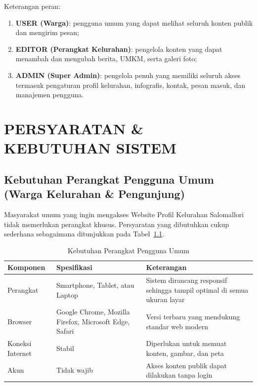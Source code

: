 \documentclass[12pt,a4paper]{report}
\begin{document}
Keterangan peran:
\begin{enumerate}[leftmargin=2em, itemsep=2pt]
    \item \textbf{USER (Warga)}: pengguna umum yang dapat melihat seluruh konten publik dan mengirim pesan;
    \item \textbf{EDITOR (Perangkat Kelurahan)}: pengelola konten yang dapat menambah dan mengubah berita, UMKM, serta galeri foto;
    \item \textbf{ADMIN (Super Admin)}: pengelola penuh yang memiliki seluruh akses termasuk pengaturan profil kelurahan, infografis, kontak, pesan masuk, dan manajemen pengguna.
\end{enumerate}

\chapter{PERSYARATAN \& KEBUTUHAN SISTEM}

\section{Kebutuhan Perangkat Pengguna Umum (Warga Kelurahan \& Pengunjung)}

Masyarakat umum yang ingin mengakses Website Profil Kelurahan Salomallori tidak memerlukan perangkat khusus. Persyaratan yang dibutuhkan cukup sederhana sebagaimana ditunjukkan pada Tabel~\ref{tab:req-user}.

\begin{table}[H]
    \centering
    \caption{Kebutuhan Perangkat Pengguna Umum}
    \label{tab:req-user}
    \begin{tabularx}{\textwidth}{llX}
        \toprule
        \textbf{Komponen} & \textbf{Spesifikasi} & \textbf{Keterangan} \\
        \midrule
        Perangkat & Smartphone, Tablet, atau Laptop & Sistem dirancang responsif sehingga tampil optimal di semua ukuran layar \\
        Browser & Google Chrome, Mozilla Firefox, Microsoft Edge, Safari & Versi terbaru yang mendukung standar web modern \\
        Koneksi Internet & Stabil & Diperlukan untuk memuat konten, gambar, dan peta \\
        Akun & Tidak wajib & Akses konten publik dapat dilakukan tanpa login \\
        \bottomrule
    \end{tabularx}
\end{table}
\end{document}
